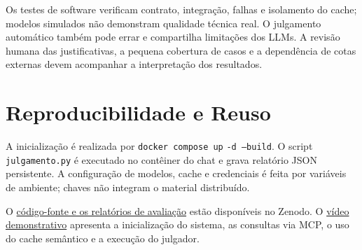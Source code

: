 Os testes de software verificam contrato, integração, falhas e isolamento do cache; modelos simulados não demonstram qualidade técnica real. O julgamento automático também pode errar e compartilha limitações dos LLMs. A revisão humana das justificativas, a pequena cobertura de casos e a dependência de cotas externas devem acompanhar a interpretação dos resultados.

\section{Reproducibilidade e Reuso}

A inicialização é realizada por \texttt{docker compose up} \texttt{-d --build}. O script \texttt{julgamento.py} é executado no contêiner do chat e grava relatório JSON persistente. A configuração de modelos, cache e credenciais é feita por variáveis de ambiente; chaves não integram o material distribuído.

O \href{https://doi.org/10.5281/zenodo.24386960}{código-fonte e os relatórios de avaliação} estão disponíveis no Zenodo. O \href{https://zenodo.org/records/24387783}{vídeo demonstrativo} apresenta a inicialização do sistema, as consultas via MCP, o uso do cache semântico e a execução do julgador.
